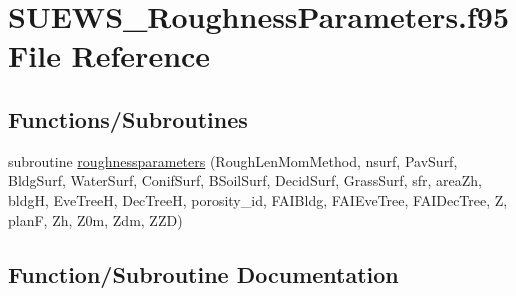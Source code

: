 \hypertarget{_s_u_e_w_s___roughness_parameters_8f95}{}\section{S\+U\+E\+W\+S\+\_\+\+Roughness\+Parameters.\+f95 File Reference}
\label{_s_u_e_w_s___roughness_parameters_8f95}
\subsection*{Functions/\+Subroutines}
\begin{DoxyCompactItemize}
\item 
subroutine \hyperlink{_s_u_e_w_s___roughness_parameters_8f95_af045b298f2d6ed45fbb8ba93a81d9568}{roughnessparameters} (Rough\+Len\+Mom\+Method, nsurf, Pav\+Surf, Bldg\+Surf, Water\+Surf, Conif\+Surf, B\+Soil\+Surf, Decid\+Surf, Grass\+Surf, sfr, area\+Zh, bldgH, Eve\+TreeH, Dec\+TreeH, porosity\+\_\+id, F\+A\+I\+Bldg, F\+A\+I\+Eve\+Tree, F\+A\+I\+Dec\+Tree, Z, planF, Zh, Z0m, Zdm, Z\+ZD)
\end{DoxyCompactItemize}


\subsection{Function/\+Subroutine Documentation}
\mbox{\label{_s_u_e_w_s___roughness_parameters_8f95_af045b298f2d6ed45fbb8ba93a81d9568}} 
